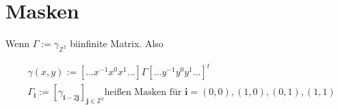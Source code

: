 \documentclass[8pt, DIV15, twocolumn]{scrartcl}
\begin{document}
\section*{Masken}

Wenn $\Gamma := \gamma_{\mathbb{Z}^2}$ biinfinite Matrix. Also

\begin{equation*}
\begin{aligned}
&\gamma\left(x,y\right) := [...x^{-1} x^0 x^1 ...] \Gamma [... y^{-1} y^0 y^1 ...]^t \\
&\Gamma_{\mathbf{i}} := [\gamma_{\mathbf{i}-2\mathbf{j}}]_{\mathbf{j}\in\mathbb{Z}^2} \text{heißen Masken für } \mathbf{i} = (0,0), (1,0), (0,1), (1,1)
\end{aligned} 
\end{equation*}
\end{document}
